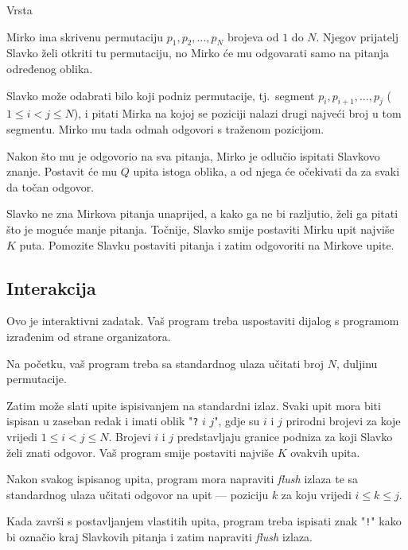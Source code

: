 \begin{statement}[
  problempoints=100,
  timelimit=1 sekunda,
  memorylimit=512 MiB,
]{Vrsta}\

Mirko ima skrivenu permutaciju $p_1, p_2, \ldots, p_N$ brojeva od $1$ do $N$. Njegov prijatelj Slavko želi otkriti tu permutaciju, no Mirko će mu odgovarati samo na pitanja određenog oblika.

Slavko može odabrati bilo koji podniz permutacije, tj.\ segment $p_i, p_{i+1}, \ldots, p_j$ ($1 \le i < j \le N$), i pitati Mirka na kojoj se poziciji nalazi drugi najveći broj u tom segmentu. Mirko mu tada odmah odgovori s traženom pozicijom.

Nakon što mu je odgovorio na sva pitanja, Mirko je odlučio ispitati Slavkovo znanje. Postavit će mu $Q$ upita istoga oblika, a od njega će očekivati da za svaki da točan odgovor.

Slavko ne zna Mirkova pitanja unaprijed, a kako ga ne bi razljutio, želi ga pitati što je moguće manje pitanja. Točnije, Slavko smije postaviti Mirku upit najviše $K$ puta. Pomozite Slavku postaviti pitanja i zatim odgovoriti na Mirkove upite.

\subsection*{Interakcija}

Ovo je interaktivni zadatak. Vaš program treba uspostaviti dijalog s programom izrađenim od strane organizatora.

Na početku, vaš program treba sa standardnog ulaza učitati broj $N$, duljinu permutacije.

Zatim može slati upite ispisivanjem na standardni izlaz. Svaki upit mora biti ispisan u zaseban redak i imati oblik "\texttt{?} $i$ $j$", gdje su $i$ i $j$ prirodni brojevi za koje vrijedi $1 \le i < j \le N$. Brojevi $i$ i $j$ predstavljaju granice podniza za koji Slavko želi znati odgovor. Vaš program smije postaviti najviše $K$ ovakvih upita.

Nakon svakog ispisanog upita, program mora napraviti \textit{flush} izlaza te sa standardnog ulaza učitati odgovor na upit — poziciju $k$ za koju vrijedi $i \le k \le j$.

Kada završi s postavljanjem vlastitih upita, program treba ispisati znak "\texttt{!}" kako bi označio kraj Slavkovih pitanja i zatim napraviti \textit{flush} izlaza.


\end{statement}
